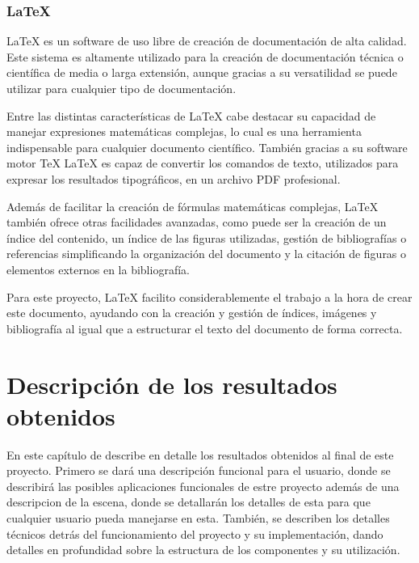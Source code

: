 \documentclass[a4paper, 12pt]{book}
\begin{document}
\subsection{LaTeX}
\label{subsec:latex}

LaTeX \cite{latexproject_about} es un software de uso libre de creación de documentación de alta calidad. Este sistema es altamente utilizado para la creación de documentación técnica o científica de media o larga extensión, aunque gracias a su versatilidad se puede utilizar para cualquier tipo de documentación.

Entre las distintas características de LaTeX cabe destacar su capacidad de manejar expresiones matemáticas complejas, lo cual es una herramienta indispensable para cualquier documento científico. También gracias a su software motor TeX LaTeX es capaz de convertir los comandos de texto, utilizados para expresar los resultados tipográficos, en un archivo PDF profesional. 

Además de facilitar la creación de fórmulas matemáticas complejas, LaTeX también ofrece otras facilidades avanzadas, como puede ser la creación de un índice del contenido, un índice de las figuras utilizadas, gestión de bibliografías o referencias simplificando la organización del documento y la citación de figuras o elementos externos en la bibliografía.

Para este proyecto, LaTeX facilito considerablemente el trabajo a la hora de crear este documento, ayudando con la creación y gestión de índices, imágenes y bibliografía al igual que a estructurar el texto del documento de forma correcta.


\cleardoublepage
\chapter{Descripción de los resultados obtenidos}
\label{chap:resultados}
En este capítulo de describe en detalle los resultados obtenidos al final de este proyecto. Primero se dará una descripción funcional para el usuario, donde se describirá las posibles aplicaciones funcionales de estre proyecto además de una descripcion de la escena, donde se detallarán los detalles de esta para que cualquier usuario pueda manejarse en esta. También, se describen los detalles técnicos detrás del funcionamiento del proyecto y su implementación,
dando detalles en profundidad sobre la estructura de los componentes y su utilización.
\end{document}
